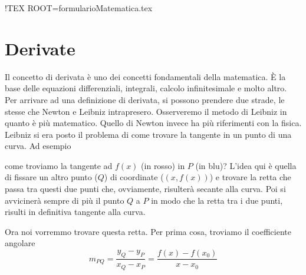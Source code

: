 !TEX ROOT=formularioMatematica.tex

\section{Derivate}\label{sec:derivate}

Il concetto di derivata è uno dei concetti fondamentali della matematica. È la base delle equazioni
differenziali, integrali, calcolo infinitesimale e molto altro.\\
Per arrivare ad una definizione di derivata, si possono prendere due strade, le stesse che Newton e 
Leibniz intrapresero. Osserveremo il metodo di Leibniz in quanto è più matematico. Quello di Newton
invece ha più riferimenti con la fisica.\\
Leibniz si era posto il problema di come trovare la tangente in un punto di una curva. Ad esempio
\begin{center}
\end{center}
come troviamo la tangente ad $f(x)$ (in rosso) in $P$ (in blu)? L'idea qui è quella di fissare un
altro punto ($Q$) di coordinate ($(x,f(x))$) e trovare la retta che passa tra questi due punti che,
ovviamente, risulterà secante alla curva. Poi si avvicinerà sempre di più il punto $Q$ a $P$ in modo
che la retta tra i due punti, risulti in definitiva tangente alla curva.
\begin{center}
\end{center}
Ora noi vorremmo trovare questa retta. Per prima cosa, troviamo il coefficiente angolare
\begin{equation*}
  m_{PQ} = \frac{y_Q-y_P}{x_Q-x_P} = \frac{f(x)-f(x_0)}{x-x_0}
\end{equation*}
